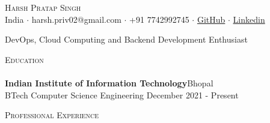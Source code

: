 \documentclass[a4paper]{article}
\newcommand{\lineunder} {
    \vspace*{-8pt} \\
    \hspace*{-18pt} \hrulefill \\
}
\newcommand{\header} [1] {
    {\hspace*{-18pt}\vspace*{6pt} \textsc{#1}}
    \vspace*{-6pt} \lineunder
}
\begin{document}
\vspace*{-40pt}

    

\vspace*{-9pt}
\begin{center}
	{\Huge \scshape {Harsh Pratap Singh}}\\
	\vspace{2mm}
	India $\cdot$ harsh.priv02@gmail.com $\cdot$ +91 7742992745 $\cdot$ \href{https://github.com/harshh2002}{GitHub} $\cdot$ \href{https://www.linkedin.com/in/harshh2002/}{Linkedin} \\
\end{center}

\begin{center}
DevOps, Cloud Computing and Backend Development Enthusiast\\
\end{center}

\header{Education}
\vspace{0mm}
\textbf{Indian Institute of Information Technology}\hfill Bhopal\\
BTech Computer Science Engineering \hfill December 2021 - Present\\
\vspace{4mm}
 


\vspace{-2mm}
\header{Professional Experience}
\end{document}
